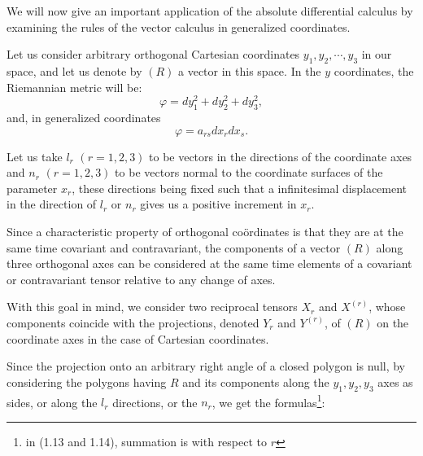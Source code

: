 \documentclass{book}
\begin{document}
We will now give an important application of the absolute differential calculus by examining the rules of the vector calculus in generalized coordinates. 

Let us consider arbitrary orthogonal Cartesian coordinates $y_1,y_2,\cdots,y_3$ in our space, and let us denote by $(R)$ a vector in this space. In the $y$ coordinates, the Riemannian metric will be:
$$\varphi=dy_1^2+dy_2^2+dy_3^2,$$
and, in generalized coordinates
$$\varphi=a_{rs}dx_rdx_s.$$

Let us take $l_r$ $(r=1,2,3)$ to be vectors in the directions of the coordinate axes and $n_r$ $(r=1,2,3)$ to be vectors normal to the coordinate surfaces of the parameter $x_r$, these directions being fixed such that a infinitesimal displacement in the direction of $l_r$ or $n_r$ gives us a positive increment in $x_r$.

Since a characteristic property of orthogonal co\"ordinates is that they are at the same time covariant and contravariant, the components of a vector $(R)$ along three orthogonal axes can be considered at the same time elements of a covariant or contravariant tensor relative to any change of axes.

With this goal in mind, we consider two reciprocal tensors $X_r$ and $X^{(r)}$, whose components coincide with the projections, denoted $Y_r$ and $Y^{(r)}$, of $(R)$ on the coordinate axes in the case of Cartesian coordinates. 

Since the projection onto an arbitrary right angle of a closed polygon is null, by considering the polygons having $R$ and its components along the $y_1,y_2,y_3$ axes as sides, or along the $l_r$ directions, or the $n_r$, we get the formulas\footnote{in (1.13 and 1.14), summation is with respect to $r$}:
\end{document}

